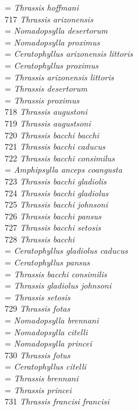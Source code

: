 \documentclass[
]{article}
\begin{document}
= \emph{Thrassis hoffmani}\\
717 \emph{Thrassis arizonensis}\\
= \emph{Nomadopsylla desertorum}\\
= \emph{Nomadopsylla proximus}\\
= \emph{Ceratophyllus arizonensis littoris}\\
= \emph{Ceratophyllus proximus}\\
= \emph{Thrassis arizonensis littoris}\\
= \emph{Thrassis desertorum}\\
= \emph{Thrassis proximus}\\
718 \emph{Thrassis augustoni}\\
719 \emph{Thrassis augustsoni}\\
720 \emph{Thrassis bacchi bacchi}\\
721 \emph{Thrassis bacchi caducus}\\
722 \emph{Thrassis bacchi consimilus}\\
= \emph{Amphipsylla anceps coangusta}\\
723 \emph{Thrassis bacchi gladiolis}\\
724 \emph{Thrassis bacchi gladiolus}\\
725 \emph{Thrassis bacchi johnsoni}\\
726 \emph{Thrassis bacchi pansus}\\
727 \emph{Thrassis bacchi setosis}\\
728 \emph{Thrassis bacchi}\\
= \emph{Ceratophyllus gladiolus caducus}\\
= \emph{Ceratophyllus pansus}\\
= \emph{Thrassis bacchi consimilis}\\
= \emph{Thrassis gladiolus johnsoni}\\
= \emph{Thrassis setosis}\\
729 \emph{Thrassis fotas}\\
= \emph{Nomadopsylla brennani}\\
= \emph{Nomadopsylla citelli}\\
= \emph{Nomadopsylla princei}\\
730 \emph{Thrassis fotus}\\
= \emph{Ceratophyllus citelli}\\
= \emph{Thrassis brennani}\\
= \emph{Thrassis princei}\\
731 \emph{Thrassis francisi francisi}\\
\end{document}
